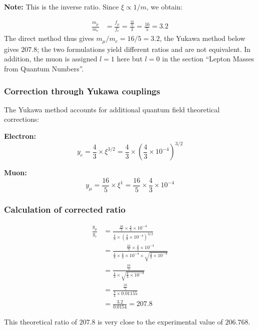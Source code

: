 \textbf{Note:} This is the inverse ratio. Since $\xi \propto 1/m$, we obtain:

\begin{align}
	\frac{m_\mu}{m_e} &= \frac{f_\mu}{f_e} = \frac{\frac{16}{5}}{1} = \frac{16}{5} = 3.2
\end{align}
The direct method thus gives $m_\mu/m_e = 16/5 = 3.2$, the Yukawa method below gives $207.8$; the two formulations yield different ratios and are not equivalent. In addition, the muon is assigned $l = 1$ here but $l = 0$ in the section \enquote{Lepton Masses from Quantum Numbers}.

\subsubsection{Correction through Yukawa couplings}

The Yukawa method accounts for additional quantum field theoretical corrections:

\textbf{Electron:}
\begin{equation}
	y_e = \frac{4}{3} \times \xi^{3/2} = \frac{4}{3} \times \left(\frac{4}{3} \times 10^{-4}\right)^{3/2}
\end{equation}

\textbf{Muon:}
\begin{equation}
	y_\mu = \frac{16}{5} \times \xi^1 = \frac{16}{5} \times \frac{4}{3} \times 10^{-4}
\end{equation}

\subsubsection{Calculation of corrected ratio}

\begin{align}
	\frac{y_\mu}{y_e} &= \frac{\frac{16}{5} \times \frac{4}{3} \times 10^{-4}}{\frac{4}{3} \times \left(\frac{4}{3} \times 10^{-4}\right)^{3/2}}\\
	&= \frac{\frac{16}{5} \times \frac{4}{3} \times 10^{-4}}{\frac{4}{3} \times \frac{4}{3} \times 10^{-4} \times \sqrt{\frac{4}{3} \times 10^{-4}}}\\
	&= \frac{\frac{16}{5}}{\frac{4}{3} \times \sqrt{\frac{4}{3} \times 10^{-4}}}\\
	&= \frac{\frac{16}{5}}{\frac{4}{3} \times 0.01155}\\
	&= \frac{3.2}{0.0154} = 207.8
\end{align}

This theoretical ratio of $207.8$ is very close to the experimental value of $206.768$.

